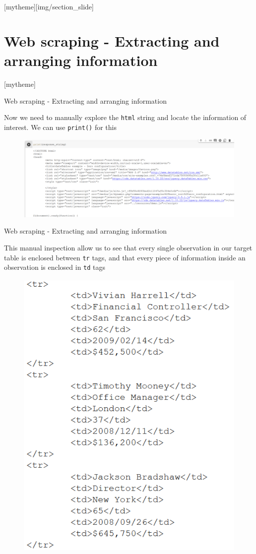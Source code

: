 \documentclass[aspectratio=169]{beamer}
\newcommand{\sectionpic}[2]{
	\setbeamertemplate{section page}[mytheme][#2]
	\section{#1}
	\setbeamertemplate{section page}[mytheme]
}
\begin{document}
\sectionpic{Web scraping - Extracting and arranging information}{img/section_slide}

\begin{frame}{Web scraping - Extracting and arranging information}

	Now we need to manually explore the \texttt{html} string and locate the information of interest. We can use \texttt{print()} for this

	\begin{figure}
		\centering
		\includegraphics[width=0.9\linewidth]{img/html_string_print.png}
	\end{figure}

\end{frame}

\begin{frame}{Web scraping - Extracting and arranging information}

	This manual inspection allow us to see that every single observation in our target table is enclosed between \texttt{tr} tags, and that every piece of information inside an observation is enclosed in \texttt{td} tags

	\begin{figure}
		\centering
		\includegraphics[width=0.3\linewidth]{img/tags2.png}
	\end{figure}

\end{frame}
\end{document}
